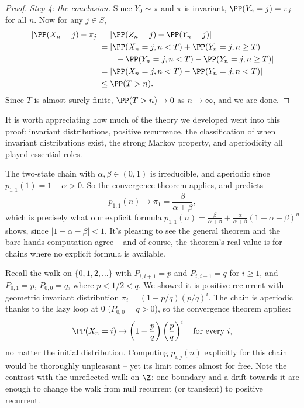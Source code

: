 \documentclass[a4paper]{scrartcl}
\begin{document}
\begin{proof}
	\emph{Step 4: the conclusion.} Since $Y_0 \sim \pi$ and $\pi$ is invariant, $\PP(Y_n = j) = \pi_j$ for all $n$. Now for any $j \in S$,
	\begin{align*}
		|\PP(X_n = j) - \pi_j| &= |\PP(Z_n = j) - \PP(Y_n = j)| \\
		&= |\PP(X_n = j, n < T) + \PP(Y_n = j, n \geq T) \\
		&\qquad - \PP(Y_n = j, n < T) - \PP(Y_n = j, n \geq T)| \\
		&= |\PP(X_n = j, n < T) - \PP(Y_n = j, n < T)| \\
		&\leq \PP(T > n).
	\end{align*}
	Since $T$ is almost surely finite, $\PP(T > n) \rightarrow 0$ as $n \rightarrow \infty$, and we are done.
\end{proof}

It is worth appreciating how much of the theory we developed went into this proof: invariant distributions, positive recurrence, the classification of when invariant distributions exist, the strong Markov property, and aperiodicity all played essential roles.

\begin{example}
	The two-state chain with $\alpha, \beta \in (0, 1)$ is irreducible, and aperiodic since $p_{1, 1}(1) = 1 - \alpha > 0$. So the convergence theorem applies, and predicts
	$$
	p_{1, 1}(n) \rightarrow \pi_1 = \frac{\beta}{\alpha + \beta},
	$$
	which is precisely what our explicit formula
	$
	p_{1, 1}(n) = \frac{\beta}{\alpha + \beta} + \frac{\alpha}{\alpha + \beta}(1 - \alpha - \beta)^n
	$
	shows, since $|1 - \alpha - \beta| < 1$. It's pleasing to see the general theorem and the bare-hands computation agree -- and of course, the theorem's real value is for chains where no explicit formula is available.
\end{example}

\begin{example}
	Recall the walk on $\{0, 1, 2, \dots\}$ with $P_{i, i + 1} = p$ and $P_{i, i - 1} = q$ for $i \geq 1$, and $P_{0, 1} = p$, $P_{0, 0} = q$, where $p < 1/2 < q$. We showed it is positive recurrent with geometric invariant distribution $\pi_i = (1 - p/q)(p/q)^i$. The chain is aperiodic thanks to the lazy loop at 0 ($P_{0,0} = q > 0$), so the convergence theorem applies:
	$$
	\PP(X_n = i) \rightarrow \left(1 - \frac{p}{q}\right)\left(\frac{p}{q}\right)^i \quad \text{for every } i,
	$$
	no matter the initial distribution. Computing $p_{i, j}(n)$ explicitly for this chain would be thoroughly unpleasant -- yet its limit comes almost for free. Note the contrast with the unreflected walk on $\Z$: one boundary and a drift towards it are enough to change the walk from null recurrent (or transient) to positive recurrent.
\end{example}
\end{document}
